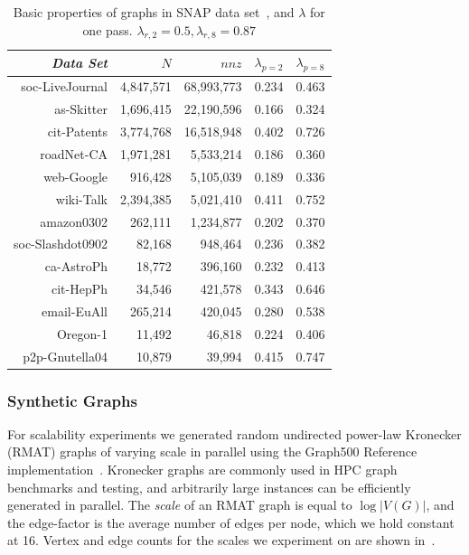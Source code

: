 \begin{table}
\caption{Basic properties of graphs in SNAP data set~\cite{Leskovec-data}, and $\lambda$ for one pass. $\lambda_{r,2}=0.5,\lambda_{r,8}=0.87$}
\centering
\small
{ \begin{tabular}{ *5r }    \toprule
\emph{Data Set} & $N$ & $nnz$  & $\lambda_{p=2}$ & $\lambda_{p=8}$ \\\midrule
soc-LiveJournal & 4,847,571 & 68,993,773  &0.234& 0.463\\
as-Skitter & 1,696,415 & 22,190,596  & 0.166&0.324\\
cit-Patents & 3,774,768 & 16,518,948  & 0.402&0.726\\
roadNet-CA & 1,971,281 & 5,533,214  & 0.186&0.360\\
web-Google & 916,428 & 5,105,039  &0.189&0.336\\
wiki-Talk & 2,394,385 & 5,021,410 &0.411&0.752\\
amazon0302 & 262,111 & 1,234,877 & 0.202&0.370\\
soc-Slashdot0902 & 82,168 & 948,464  &0.236&0.382\\
ca-AstroPh & 18,772 & 396,160 & 0.232&0.413\\
cit-HepPh & 34,546 & 421,578 & 0.343&0.646\\
email-EuAll & 265,214 & 420,045 & 0.280&0.538\\
Oregon-1 & 11,492 & 46,818  & 0.224&0.406\\
p2p-Gnutella04 & 10,879 & 39,994  & 0.415&0.747\\
 \hline
\end{tabular}\par
}
\label{tab:rw}
\end{table}

\subsubsection{Synthetic Graphs}
For scalability experiments we generated random undirected power-law Kronecker (RMAT) graphs of varying scale in parallel using the Graph500 Reference implementation~\cite{graph500}. Kronecker graphs are commonly used in HPC graph benchmarks and testing, and arbitrarily large instances can be efficiently generated in parallel. The \emph{scale} of an RMAT graph is equal to $\log |V(G)|$, and the edge-factor is the average number of edges per node, which we hold constant at 16. Vertex and edge counts for the scales we experiment on are shown in~.

